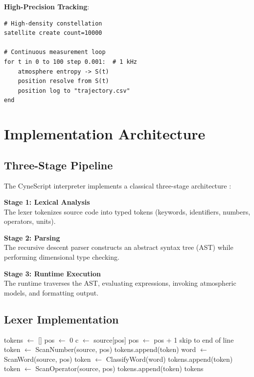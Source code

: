 \documentclass[twocolumn,10pt,a4paper]{article}
\theoremstyle{definition}
\theoremstyle{remark}
\begin{document}
\textbf{High-Precision Tracking}:
\begin{lstlisting}
# High-density constellation
satellite create count=10000

# Continuous measurement loop
for t in 0 to 100 step 0.001:  # 1 kHz
    atmosphere entropy -> S(t)
    position resolve from S(t)
    position log to "trajectory.csv"
end
\end{lstlisting}

\section{Implementation Architecture}
\label{sec:implementation}

\subsection{Three-Stage Pipeline}

The CyneScript interpreter implements a classical three-stage architecture \cite{aho2006compilers}:

\textbf{Stage 1: Lexical Analysis}\\
The lexer tokenizes source code into typed tokens (keywords, identifiers, numbers, operators, units).

\textbf{Stage 2: Parsing}\\
The recursive descent parser constructs an abstract syntax tree (AST) while performing dimensional type checking.

\textbf{Stage 3: Runtime Execution}\\
The runtime traverses the AST, evaluating expressions, invoking atmospheric models, and formatting output.

\subsection{Lexer Implementation}

\begin{algorithm}[H]
\caption{CyneScript Lexer}
\label{alg:lexer}
\begin{algorithmic}[1]
    \STATE tokens $\gets$ []
    \STATE pos $\gets$ 0
        \STATE c $\gets$ source[pos]
            \STATE pos $\gets$ pos + 1
            \STATE skip to end of line
            \STATE token $\gets$ ScanNumber(source, pos)
            \STATE tokens.append(token)
            \STATE word $\gets$ ScanWord(source, pos)
            \STATE token $\gets$ ClassifyWord(word)
            \STATE tokens.append(token)
        \ELSE
            \STATE token $\gets$ ScanOperator(source, pos)
            \STATE tokens.append(token)
        \ENDIF
    \ENDWHILE
    \RETURN tokens
\ENDFUNCTION
\end{algorithmic}
\end{algorithm}
\end{document}
